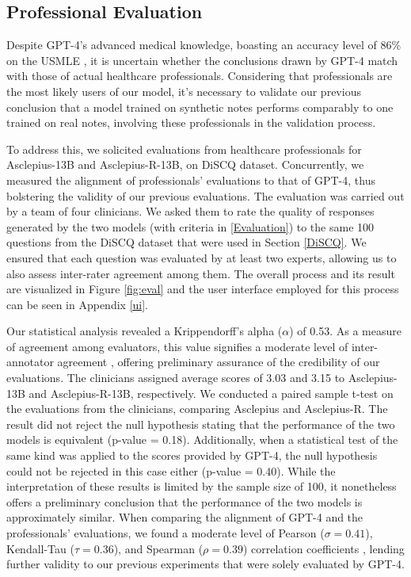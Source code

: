 \documentclass[11pt]{article}
\begin{document}
\subsection{Professional Evaluation}\label{Professional Assessment}

Despite GPT-4's advanced medical knowledge, boasting an accuracy level of 86\% on the USMLE \citep{nori2023capabilities}, it is uncertain whether the conclusions drawn by GPT-4 match with those of actual healthcare professionals. 
Considering that professionals are the most likely users of our model, it's necessary to validate our previous conclusion that a model trained on synthetic notes performs comparably to one trained on real notes, involving these professionals in the validation process.


To address this, we solicited evaluations from healthcare professionals for Asclepius-13B and Asclepius-R-13B, on DiSCQ dataset.
Concurrently, we measured the alignment of professionals' evaluations to that of GPT-4, thus bolstering the validity of our previous evaluations.
The evaluation was carried out by a team of four clinicians. 
We asked them to rate the quality of responses generated by the two models (with criteria in \ref{Evaluation}) to the same 100 questions from the DiSCQ dataset that were used in Section \ref{DiSCQ}.
We ensured that each question was evaluated by at least two experts, allowing us to also assess inter-rater agreement among them. 
The overall process and its result are visualized in Figure \ref{fig:eval} and the user interface employed for this process can be seen in Appendix \ref{ui}.


Our statistical analysis revealed a Krippendorff's alpha ($\alpha$) of 0.53. 
As a measure of agreement among evaluators, this value signifies a moderate level of inter-annotator agreement \citep{landis1977measurement}, offering preliminary assurance of the credibility of our evaluations.
The clinicians assigned average scores of 3.03 and 3.15 to Asclepius-13B and Asclepius-R-13B, respectively.
We conducted a paired sample t-test on the evaluations from the clinicians, comparing Asclepius and Asclepius-R. 
The result did not reject the null hypothesis stating that the performance of the two models is equivalent (p-value = 0.18).
Additionally, when a statistical test of the same kind was applied to the scores provided by GPT-4, the null hypothesis could not be rejected in this case either (p-value = 0.40). 
While the interpretation of these results is limited by the sample size of 100, it nonetheless offers a preliminary conclusion that the performance of the two models is approximately similar.
When comparing the alignment of GPT-4 and the professionals' evaluations, we found a moderate level of Pearson ($\sigma=0.41$), Kendall-Tau ($\tau=0.36$), and Spearman ($\rho=0.39$) correlation coefficients \citep{landis1977measurement}, lending further validity to our previous experiments that were solely evaluated by GPT-4.
\end{document}
